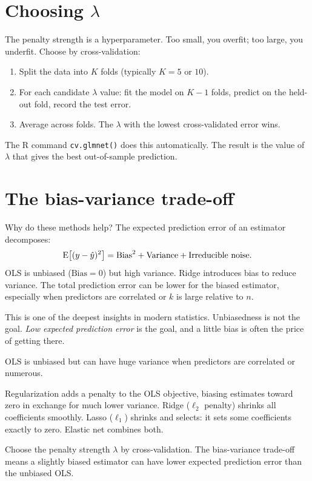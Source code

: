 \section{Choosing $\lambda$}

The penalty strength is a hyperparameter. Too small, you overfit; too large, you underfit. Choose by cross-validation:

\begin{enumerate}[noitemsep]
\item Split the data into $K$ folds (typically $K = 5$ or $10$).
\item For each candidate $\lambda$ value: fit the model on $K-1$ folds, predict on the held-out fold, record the test error.
\item Average across folds. The $\lambda$ with the lowest cross-validated error wins.
\end{enumerate}

The R command \texttt{cv.glmnet()} does this automatically. The result is the value of $\lambda$ that gives the best out-of-sample prediction.

\section{The bias-variance trade-off}

Why do these methods help? The expected prediction error of an estimator decomposes:
\begin{equation}
  \operatorname{E}\bigl[(y - \hat y)^2\bigr] = \text{Bias}^2 + \text{Variance} + \text{Irreducible noise}.
  \label{eq:bias-variance}
\end{equation}
OLS is unbiased ($\text{Bias} = 0$) but high variance. Ridge introduces bias to reduce variance. The total prediction error can be lower for the biased estimator, especially when predictors are correlated or $k$ is large relative to $n$.

This is one of the deepest insights in modern statistics. Unbiasedness is not the goal. \emph{Low expected prediction error} is the goal, and a little bias is often the price of getting there.

\begin{keyinsight}
OLS is unbiased but can have huge variance when predictors are correlated or numerous.

Regularization adds a penalty to the OLS objective, biasing estimates toward zero in exchange for much lower variance. Ridge ($\ell_2$ penalty) shrinks all coefficients smoothly. Lasso ($\ell_1$) shrinks and selects: it sets some coefficients exactly to zero. Elastic net combines both.

Choose the penalty strength $\lambda$ by cross-validation. The bias-variance trade-off means a slightly biased estimator can have lower expected prediction error than the unbiased OLS.
\end{keyinsight}

